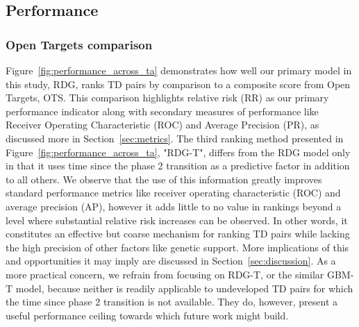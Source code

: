 \documentclass{article}
\begin{document}
\subsection{Performance}
\label{sec:results_performance}

\subsubsection{Open Targets comparison}

Figure~\ref{fig:performance_across_ta} demonstrates how well our primary model in this study, RDG, ranks TD pairs by comparison to a composite score from Open Targets, OTS. This comparison highlights relative risk (RR) as our primary performance indicator along with secondary measures of performance like Receiver Operating Characteristic (ROC) and Average Precision (PR), as discussed more in Section~\ref{sec:metrics}. The third ranking method presented in Figure~\ref{fig:performance_across_ta}, "RDG-T", differs from the RDG model only in that it uses time since the phase 2 transition as a predictive factor in addition to all others. We observe that the use of this information greatly improves standard performance metrics like receiver operating characteristic (ROC) and average precision (AP), however it adds little to no value in rankings beyond a level where substantial relative risk increases can be observed. In other words, it constitutes an effective but coarse mechanism for ranking TD pairs while lacking the high precision of other factors like genetic support. More implications of this and opportunities it may imply are discussed in Section~\ref{sec:discussion}. As a more practical concern, we refrain from focusing on RDG-T, or the similar GBM-T model, because neither is readily applicable to undeveloped TD pairs for which the time since phase 2 transition is not available. They do, however, present a useful performance ceiling towards which future work might build.
\end{document}
